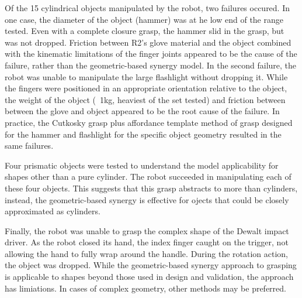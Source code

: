 \documentclass[runningheads,a4paper]{llncs}
\begin{document}
Of the 15 cylindrical objects manipulated by the robot, two failures occured. In one case, the diameter of the object (hammer) was at he low end of the range tested. Even with a complete closure grasp, the hammer slid in the grasp, but was not dropped. Friction between R2's glove material and the object combined with the kinematic limitations of the finger joints appeared to be the cause of the failure, rather than the geometric-based synergy model. In the second failure, the robot was unable to manipulate the large flashlight without dropping it. While the fingers were positioned in an appropriate orientation relative to the object, the weight of the object (~1kg, heaviest of the set tested) and friction between between the glove and object appeared to be the root cause of the failure. In practice, the Cutkosky grasp plus affordance template method of grasp designed for the hammer and flashlight for the specific object geometry resulted in the same failures. 

Four prismatic objects were tested to understand the model applicability for shapes other than a pure cylinder. The robot succeeded in manipulating each of these four objects. This suggests that this grasp abstracts to more than cylinders, instead, the geometric-based synergy is effective for ojects that could be closely approximated as cylinders.

Finally, the robot was unable to grasp the complex shape of the Dewalt impact driver. As the robot closed its hand, the index finger caught on the trigger, not allowing the hand to fully wrap around the handle. During the rotation action, the object was dropped. 
While the geometric-based synergy approach to grasping is applicable to shapes beyond those used in design and validation, the approach has limiations. In cases of complex geometry, other methods may be preferred. 


\end{document}
